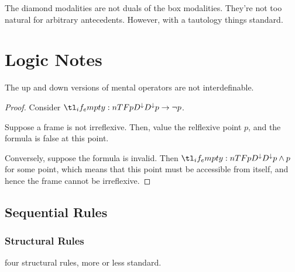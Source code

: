 \documentclass[10pt]{article}
\begin{document}
The diamond modalities are not duals of the box modalities.
They're not too natural for arbitrary antecedents.
However, with a tautology things standard.

\newpage


\section{Logic Notes}
\label{sec:logic-notes}

\begin{proposition}
  The up and down versions of mental operators are not interdefinable.
  \begin{proof}
    Consider \(\ldesd{p} \rightarrow \lnot p\).

    Suppose a frame is not irreflexive. Then, value the relflexive point \(p\), and the formula is false at this point.

    Conversely, suppose the formula is invalid.
    Then \(\ldesd{p} \land p\) for some point, which means that this point must be accessible from itself, and hence the frame cannot be irreflexive.
  \end{proof}
\end{proposition}



\subsection{Sequential Rules}
\label{sec:sequential-rules}

\subsubsection{Structural Rules}
\label{sec:structural-rules}


four structural rules, more or less standard.




\begin{multicols}{2}

\end{multicols}
\end{document}
